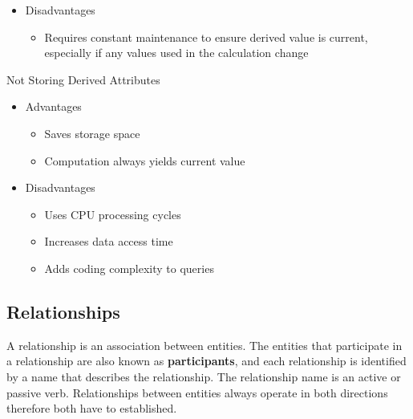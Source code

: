 \documentclass[a4paper, 12pt, titlepage]{report}
\begin{document}
{\begin{itemize}
\begin{itemize}
\item Data value is readily available
\item Can be used to keep track of historical data
\end{itemize}
\item Disadvantages
\begin{itemize}
\item Requires constant maintenance to ensure derived value is current, especially if any values used in the calculation change
\end{itemize}
\end{itemize}
Not Storing Derived Attributes
\begin{itemize}
\item Advantages
\begin{itemize}
\item Saves storage space
\item Computation always yields current value
\end{itemize}
\item Disadvantages
\begin{itemize}
\item Uses CPU processing cycles
\item Increases data access time
\item Adds coding complexity to queries
\end{itemize}
\end{itemize}
\subsection{Relationships}
A relationship is an association between entities. The entities that participate in a relationship are also known as \textbf{participants}, and each relationship is identified by a name that describes the relationship. The relationship name is an active or passive verb. Relationships between entities always operate in both directions therefore both have to established.
}
\end{document}
